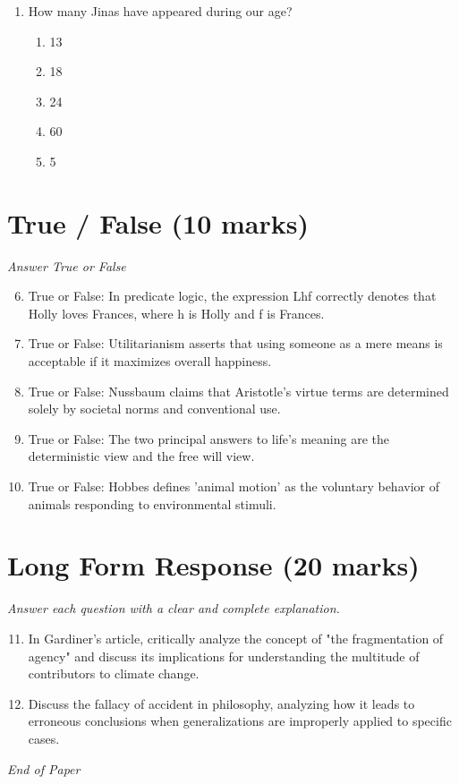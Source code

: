 \documentclass[12pt]{article}
\begin{document}
\begin{enumerate}[label=\arabic*.]
\begin{enumerate}[label=(\alph*)]
    \item why people who preserve the environment might be good people.
    \item how destroying the environment affects future generations.
    \item why the act of destroying nature might be immoral.
\end{enumerate}
\item How many Jinas have appeared during our age?
\begin{enumerate}[label=(\alph*)]
    \item 13
    \item 18
    \item 24
    \item 60
    \item 5
\end{enumerate}
\end{enumerate}

\section*{True / False (10 marks)}
\textit{Answer True or False}
\begin{enumerate}[label=\arabic*.]
\setcounter{enumi}{5}
\item True or False: In predicate logic, the expression Lhf correctly denotes that Holly loves Frances, where h is Holly and f is Frances.
\item True or False: Utilitarianism asserts that using someone as a mere means is acceptable if it maximizes overall happiness.
\item True or False: Nussbaum claims that Aristotle's virtue terms are determined solely by societal norms and conventional use.
\item True or False: The two principal answers to life's meaning are the deterministic view and the free will view.
\item True or False: Hobbes defines 'animal motion' as the voluntary behavior of animals responding to environmental stimuli.
\end{enumerate}

\section*{Long Form Response (20 marks)}
\textit{Answer each question with a clear and complete explanation.}
\begin{enumerate}[label=\arabic*.]
\setcounter{enumi}{10}
\item In Gardiner's article, critically analyze the concept of "the fragmentation of agency" and discuss its implications for understanding the multitude of contributors to climate change.
\item Discuss the fallacy of accident in philosophy, analyzing how it leads to erroneous conclusions when generalizations are improperly applied to specific cases.
\end{enumerate}

\vfill
\noindent\textit{End of Paper}
\end{document}
